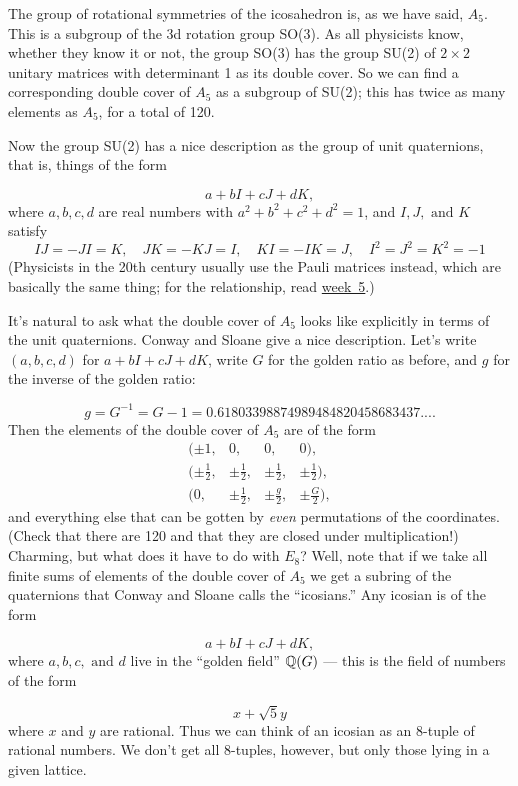 The group of rotational symmetries of the icosahedron is, as we have said, $A_5$. This is a subgroup of the 3d rotation group SO(3). As all physicists know, whether they know it or not, the group SO(3) has the group SU(2) of $2 \times 2$ unitary matrices with determinant 1 as its double cover. So we can find a corresponding double cover of $A_5$ as a subgroup of SU(2); this has twice as many elements as $A_5$, for a total of 120.

Now the group SU(2) has a nice description as the group of unit quaternions, that is, things of the form

\[          a + bI + cJ + dK,\]
where $a,b,c,d$ are real numbers with $a^2 + b^2 + c^2 + d^2 = 1$, and $I,J,\text{ and }K$ satisfy
\[IJ = -JI = K, \quad	JK = -KJ = I, \quad   KI = -IK = J, \quad  I^2 = J^2 = K^2 = -1\]
(Physicists in the 20th century usually use the Pauli matrices instead, which are basically the same thing; for the relationship, read {\hyperref[find5.1]{week~5}}.)

It's natural to ask what the double cover of $A_5$ looks like explicitly in terms of the unit quaternions. Conway and Sloane give a nice description. Let's write $(a,b,c,d)$ for $a + bI + cJ + dK$, write $G$ for the golden ratio as before, and $g$ for the inverse of the golden ratio:

\[ g = G^{-1} = G - 1 = 0.61803398874989484820458683437....\]
Then the elements of the double cover of $A_5$ are of the form
\[
\begin{array}{lccr}
(\pm 1, & 0, & 0, & 0),\\[1ex]
(\pm \frac{1}{2}, & \pm \frac{1}{2}, & \pm \frac{1}{2}, & \pm \frac{1}{2}),\\[1ex]
(    0, & \pm \frac{1}{2}, & \pm \frac{g}{2}, & \pm \frac{G}{2}),
\end{array}
\]
and everything else that can be gotten by \emph{even} permutations of the coordinates. (Check that there are 120 and that they are closed under multiplication!)
Charming, but what does it have to do with $E_8$? Well, note that if we take all finite sums of elements of the double cover of $A_5$ we get a subring of the quaternions that Conway and Sloane calls the ``icosians.'' Any icosian is of the form

\[           a + bI + cJ + dK,\]
where $a,b,c,\text{ and }d$ live in the ``golden field'' $\mathbb Q(G)$ --- this is the field of numbers of the form

\[            x + \sqrt{5} y\]
where $x$ and $y$ are rational. Thus we can think of an icosian as an 8-tuple of rational numbers. We don't get all 8-tuples, however, but only those lying in a given lattice.

